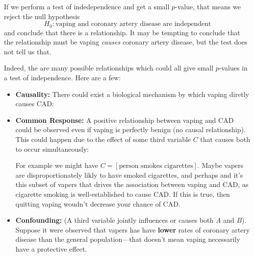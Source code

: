 \documentclass[10pt]{article}
\theoremstyle{definition}
\newcommand{\1}[1]{\textbf{1}_{\left[#1\right]}} %
\begin{document}
If we perform a test of indedependence and get a small $p$-value, that means
we reject the null hypothesis
\begin{equation*}
  H_{0}: \text{vaping and coronary artery disease are independent}
\end{equation*}
and conclude that there is a relationship. It may be tempting to conclude that
the relationship must be vaping \textit{causes} coronary artery disease, but
the test does not tell us that.

Indeed, the are many possible relationships which could all give small
$p$-values in a test of independence. Here are a few:


\begin{itemize}
  \item \textbf{Causality:} There could exist a biological mechanism by which
  vaping diretly causes CAD:
  \begin{center}
  \end{center}
  \item \textbf{Common Response:} A positive relationship between vaping and
  CAD could be observed even if vaping is perfectly benign (no causal
  relationship). This could happen due to the effect of some third variable
  $C$ that causes both to occur simultaneously:
  \begin{center}
  \end{center}
  For example we might have
  $C=\left[ \text{person smokes cigarettes} \right]$. Maybe vapers are
  disproportionately likly to have smoked cigarettes, and perhaps and it's
  this subset of vapers that drives the association between vaping and CAD, as
  cigarette smoking is well-established to cause CAD. If this is true, then
  quitting vaping woudn't decrease your chance of CAD.

  \item \textbf{Confounding:} (A third variable jointly influences or causes
  both $A$ and $B$). Suppose it were observed that vapers has have
  \textbf{lower} rates of coronary artery disease than the general
  population---that doesn't mean vaping necessarily have a protective effect.


\end{itemize}
\end{document}
